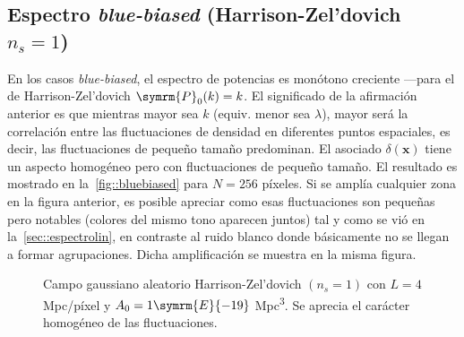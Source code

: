 \subsection{Espectro \textit{blue-biased} (Harrison-Zel'dovich \texorpdfstring{\(n_s=1\)}{ns=1})}
En los casos \textit{blue-biased}, el espectro de potencias es monótono creciente ---para el de Harrison-Zel'dovich \(\symrm{P}_0(k)=k\). El significado de la afirmación anterior es que mientras mayor sea \(k\) (equiv. menor sea \(\lambda\)), mayor será la correlación entre las fluctuaciones de densidad en diferentes puntos espaciales, es decir, las fluctuaciones de pequeño tamaño predominan. El asociado \(\delta(\symbf{x})\) tiene un aspecto homogéneo pero con fluctuaciones de pequeño tamaño. El resultado es mostrado en la~\autoref{fig::bluebiased} para \(N=256\) píxeles.
Si se amplía cualquier zona en la figura anterior, es posible apreciar como esas fluctuaciones son pequeñas pero notables (colores del mismo tono aparecen juntos) tal y como se vió en la~\autoref{sec::espectrolin}, en contraste al ruido blanco donde básicamente no se llegan a formar agrupaciones. Dicha amplificación se muestra en la misma figura.
\begin{figure}
    \centering
    \def\svgwidth{.94\textwidth}
    
    \caption[Harrison-Zel'dovich \(N=256\) píxeles]{Campo gaussiano aleatorio Harrison-Zel'dovich \((n_s=1)\) con \(L=4\) Mpc/píxel y \(A_0=1\symrm{E}{-19}\) Mpc\textsuperscript{3}. Se aprecia el carácter homogéneo de las fluctuaciones.}
    \label{fig::bluebiased}
\end{figure}
\newpage

